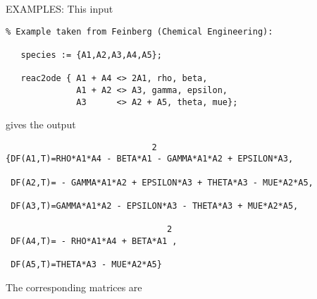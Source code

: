 EXAMPLES:
This input
\begin{verbatim}
% Example taken from Feinberg (Chemical Engineering):

   species := {A1,A2,A3,A4,A5};

   reac2ode { A1 + A4 <> 2A1, rho, beta,
              A1 + A2 <> A3, gamma, epsilon,
              A3      <> A2 + A5, theta, mue};
\end{verbatim}
gives the output
\begin{verbatim}
                             2
{DF(A1,T)=RHO*A1*A4 - BETA*A1 - GAMMA*A1*A2 + EPSILON*A3,

 DF(A2,T)= - GAMMA*A1*A2 + EPSILON*A3 + THETA*A3 - MUE*A2*A5,

 DF(A3,T)=GAMMA*A1*A2 - EPSILON*A3 - THETA*A3 + MUE*A2*A5,

                                2
 DF(A4,T)= - RHO*A1*A4 + BETA*A1 ,

 DF(A5,T)=THETA*A3 - MUE*A2*A5}
\end{verbatim}
The corresponding matrices are
